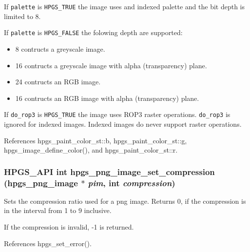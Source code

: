 If {\tt palette} is {\tt HPGS\_\-TRUE} the image uses and indexed palette and the bit depth is limited to 8.

If {\tt palette} is {\tt HPGS\_\-FALSE} the folowing depth are supported: \begin{itemize}
\item 8 contructs a greyscale image. \item 16 contructs a greyscale image with alpha (transparency) plane. \item 24 contructs an RGB image. \item 16 contructs an RGB image with alpha (transparency) plane.\end{itemize}
If {\tt do\_\-rop3} is {\tt HPGS\_\-TRUE} the image uses ROP3 raster operations. {\tt do\_\-rop3} is ignored for indexed images. Indexed images do never support raster operations. 

References hpgs\_\-paint\_\-color\_\-st::b, hpgs\_\-paint\_\-color\_\-st::g, hpgs\_\-image\_\-define\_\-color(), and hpgs\_\-paint\_\-color\_\-st::r.
\subsubsection[hpgs\_\-png\_\-image\_\-set\_\-compression]{\setlength{\rightskip}{0pt plus 5cm}HPGS\_\-API int hpgs\_\-png\_\-image\_\-set\_\-compression (hpgs\_\-png\_\-image $\ast$ {\em pim}, \/  int {\em compression})}\label{group__image_g8ce473703db5e914363733df424e81cc}


Sets the compression ratio used for a png image. Returns 0, if the compression is in the interval from 1 to 9 inclusive.

If the compression is invalid, -1 is returned. 

References hpgs\_\-set\_\-error().